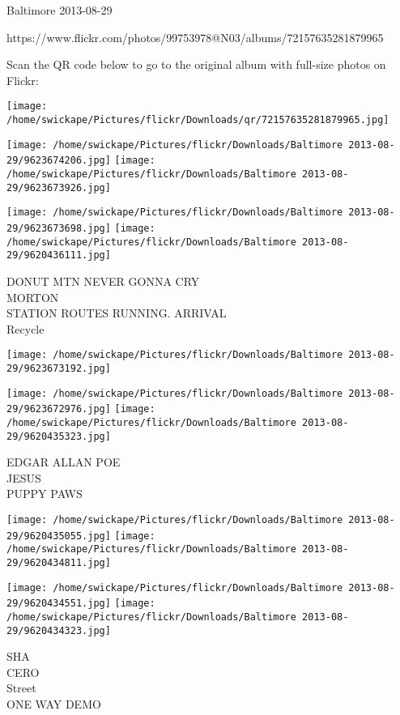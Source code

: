 \documentclass[10pt,letterpaper]{article}
\begin{document}
Baltimore 2013-08-29

https://www.flickr.com/photos/99753978@N03/albums/72157635281879965

Scan the QR code below to go to the original album with full-size photos on Flickr:

\texttt{[image: /home/swickape/Pictures/flickr/Downloads/qr/72157635281879965.jpg]}
\pagebreak

\texttt{[image: /home/swickape/Pictures/flickr/Downloads/Baltimore 2013-08-29/9623674206.jpg]}
\texttt{[image: /home/swickape/Pictures/flickr/Downloads/Baltimore 2013-08-29/9623673926.jpg]}

\texttt{[image: /home/swickape/Pictures/flickr/Downloads/Baltimore 2013-08-29/9623673698.jpg]}
\texttt{[image: /home/swickape/Pictures/flickr/Downloads/Baltimore 2013-08-29/9620436111.jpg]}

DONUT MTN NEVER GONNA CRY\\
MORTON\\
STATION ROUTES RUNNING. ARRIVAL\\
Recycle\\
\pagebreak

\texttt{[image: /home/swickape/Pictures/flickr/Downloads/Baltimore 2013-08-29/9623673192.jpg]}

\vspace{0.25in}
\texttt{[image: /home/swickape/Pictures/flickr/Downloads/Baltimore 2013-08-29/9623672976.jpg]}
\texttt{[image: /home/swickape/Pictures/flickr/Downloads/Baltimore 2013-08-29/9620435323.jpg]}

EDGAR ALLAN POE\\
JESUS\\
PUPPY PAWS\\
\pagebreak

\texttt{[image: /home/swickape/Pictures/flickr/Downloads/Baltimore 2013-08-29/9620435055.jpg]}
\texttt{[image: /home/swickape/Pictures/flickr/Downloads/Baltimore 2013-08-29/9620434811.jpg]}

\texttt{[image: /home/swickape/Pictures/flickr/Downloads/Baltimore 2013-08-29/9620434551.jpg]}
\texttt{[image: /home/swickape/Pictures/flickr/Downloads/Baltimore 2013-08-29/9620434323.jpg]}

SHA\\
CERO\\
Street\\
ONE WAY DEMO\\
\pagebreak
\end{document}
